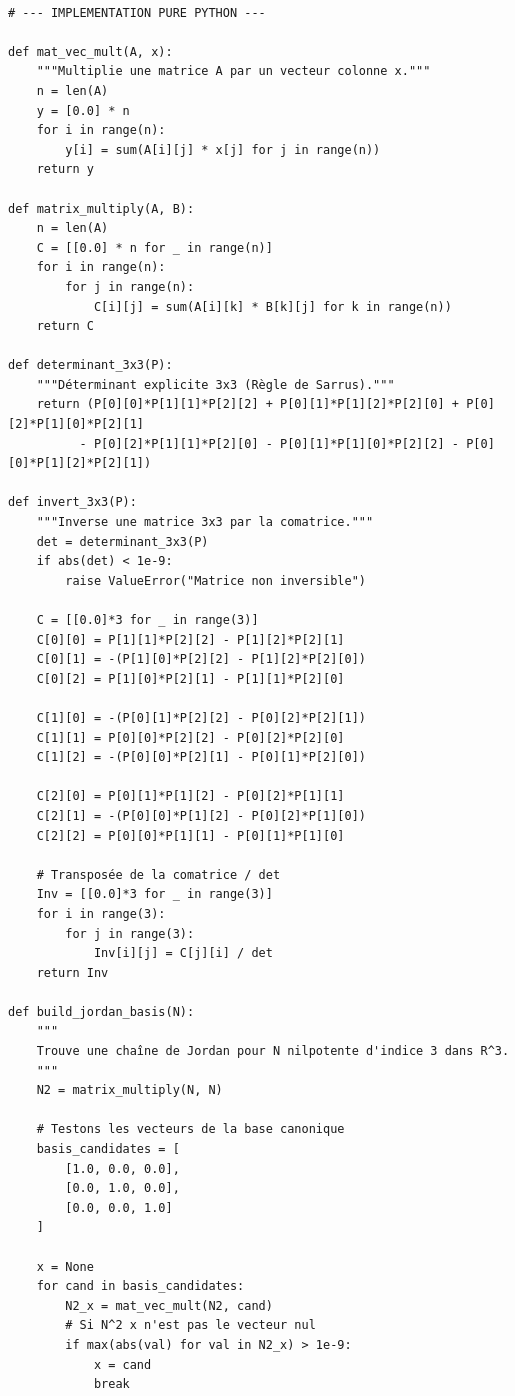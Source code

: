 \documentclass[11pt,a4paper]{article}
\begin{document}
\begin{lstlisting}

# --- IMPLEMENTATION PURE PYTHON ---

def mat_vec_mult(A, x):
    """Multiplie une matrice A par un vecteur colonne x."""
    n = len(A)
    y = [0.0] * n
    for i in range(n):
        y[i] = sum(A[i][j] * x[j] for j in range(n))
    return y

def matrix_multiply(A, B):
    n = len(A)
    C = [[0.0] * n for _ in range(n)]
    for i in range(n):
        for j in range(n):
            C[i][j] = sum(A[i][k] * B[k][j] for k in range(n))
    return C

def determinant_3x3(P):
    """Déterminant explicite 3x3 (Règle de Sarrus)."""
    return (P[0][0]*P[1][1]*P[2][2] + P[0][1]*P[1][2]*P[2][0] + P[0][2]*P[1][0]*P[2][1]
          - P[0][2]*P[1][1]*P[2][0] - P[0][1]*P[1][0]*P[2][2] - P[0][0]*P[1][2]*P[2][1])

def invert_3x3(P):
    """Inverse une matrice 3x3 par la comatrice."""
    det = determinant_3x3(P)
    if abs(det) < 1e-9:
        raise ValueError("Matrice non inversible")

    C = [[0.0]*3 for _ in range(3)]
    C[0][0] = P[1][1]*P[2][2] - P[1][2]*P[2][1]
    C[0][1] = -(P[1][0]*P[2][2] - P[1][2]*P[2][0])
    C[0][2] = P[1][0]*P[2][1] - P[1][1]*P[2][0]

    C[1][0] = -(P[0][1]*P[2][2] - P[0][2]*P[2][1])
    C[1][1] = P[0][0]*P[2][2] - P[0][2]*P[2][0]
    C[1][2] = -(P[0][0]*P[2][1] - P[0][1]*P[2][0])

    C[2][0] = P[0][1]*P[1][2] - P[0][2]*P[1][1]
    C[2][1] = -(P[0][0]*P[1][2] - P[0][2]*P[1][0])
    C[2][2] = P[0][0]*P[1][1] - P[0][1]*P[1][0]

    # Transposée de la comatrice / det
    Inv = [[0.0]*3 for _ in range(3)]
    for i in range(3):
        for j in range(3):
            Inv[i][j] = C[j][i] / det
    return Inv

def build_jordan_basis(N):
    """
    Trouve une chaîne de Jordan pour N nilpotente d'indice 3 dans R^3.
    """
    N2 = matrix_multiply(N, N)

    # Testons les vecteurs de la base canonique
    basis_candidates = [
        [1.0, 0.0, 0.0],
        [0.0, 1.0, 0.0],
        [0.0, 0.0, 1.0]
    ]

    x = None
    for cand in basis_candidates:
        N2_x = mat_vec_mult(N2, cand)
        # Si N^2 x n'est pas le vecteur nul
        if max(abs(val) for val in N2_x) > 1e-9:
            x = cand
            break


\end{lstlisting}
\end{document}
